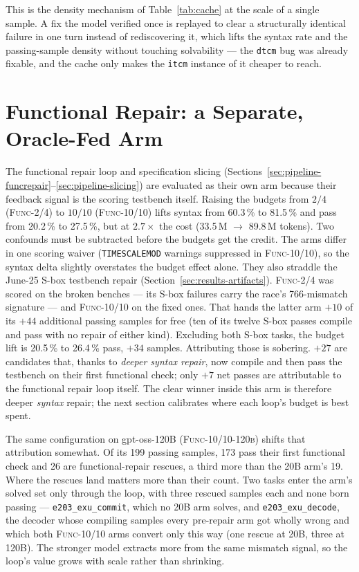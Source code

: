 This is the density mechanism of Table~\ref{tab:cache} at the scale of a
single sample. A fix the model verified once is replayed to clear a
structurally identical failure in one turn instead of rediscovering it,
which lifts the syntax rate and the passing-sample density without
touching solvability --- the \texttt{dtcm} bug was already fixable, and
the cache only makes the \texttt{itcm} instance of it cheaper to reach.

\section{Functional Repair: a Separate, Oracle-Fed Arm}
\label{sec:results-funcrepair}

The functional repair loop and specification slicing
(Sections~\ref{sec:pipeline-funcrepair}--\ref{sec:pipeline-slicing}) are
evaluated as their own arm because their feedback signal is the scoring
testbench itself. Raising the budgets from $2/4$ (\textsc{Func-2/4}) to
$10/10$ (\textsc{Func-10/10}) lifts syntax from 60.3\,\% to 81.5\,\% and
pass from 20.2\,\% to 27.5\,\%, but at $2.7\times$ the cost (33.5\,M
$\to$ 89.8\,M tokens). Two confounds must be subtracted before the
budgets get the credit. The arms differ in one scoring waiver
(\texttt{TIMESCALEMOD} warnings suppressed in \textsc{Func-10/10}), so
the syntax delta slightly overstates the budget effect alone. They also
straddle the June-25 S-box testbench repair
(Section~\ref{sec:results-artifacts}). \textsc{Func-2/4} was scored on
the broken benches --- its S-box failures carry the race's
766-mismatch signature --- and \textsc{Func-10/10} on the fixed ones.
That hands the latter arm $+10$ of its $+44$ additional passing
samples for free (ten of its twelve S-box passes compile and pass with
no repair of either kind). Excluding both S-box tasks, the budget lift
is 20.5\,\% to 26.4\,\% pass, $+34$ samples. Attributing those is
sobering. $+27$ are candidates that, thanks to \emph{deeper syntax
repair}, now compile and then pass the testbench on their first
functional check; only $+7$ net passes are attributable to the
functional repair loop itself. The clear winner inside this arm is
therefore deeper \emph{syntax} repair; the next section calibrates where
each loop's budget is best spent.

The same configuration on gpt-oss-120B (\textsc{Func-10/10-120b})
shifts that attribution somewhat. Of its 199 passing samples, 173
pass their first functional check and 26 are functional-repair
rescues, a third more than the 20B arm's 19. Where the rescues land
matters more than their count. Two tasks enter the arm's solved set
only through the loop, with three rescued samples each and none born
passing --- \texttt{e203\_exu\_commit}, which no 20B arm solves, and
\texttt{e203\_exu\_decode}, the decoder whose compiling samples every
pre-repair arm got wholly wrong and which both \textsc{Func-10/10}
arms convert only this way (one rescue at 20B, three at 120B). The
stronger model extracts more from the same mismatch signal, so the
loop's value grows with scale rather than shrinking.

